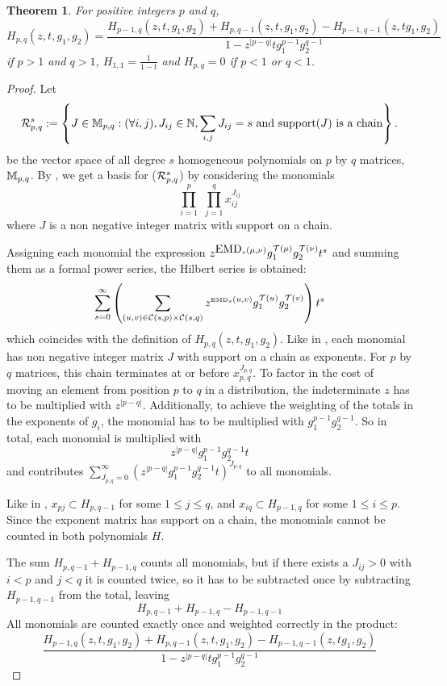 \documentclass[12pt,letterpaper,oneside,openany]{book}
\newtheorem{theorem}[equation]{Theorem}
\begin{document}
\setcounter{section}{3}
\begin{theorem}\label{thm:HSg}
 	For positive integers $p$ and $q$,
 	\[ H_{p,q}(z,t, g_1, g_2) = \frac{ H_{p-1,q}(z,t, g_1, g_2) + H_{p,q-1}(z,t, g_1, g_2) - H_{p-1,q-1}(z,tg_1, g_2) }{1- z^{|p-q|} tg_1^{p-1}g_2^{q-1}}  \]
 	if $p>1$ and $q>1$, $H_{1,1} = \frac{1}{1-t}$ and $H_{p,q}=0$ if $p<1$ or $q<1$.
\end{theorem}
\begin{proof}
	Let 
	\[
	{\mathcal{R}}_{p,q}^s :=  \left\{ J \in {\mathbb{M}}_{p,q} :(\forall i,j), J_{ij} \in {\mathbb{N}}, \sum_{i,j} J_{ij} = s \mbox{ and support$(J)$ is a chain}   \right\}.
	\]
	be the vector space of all degree $s$ homogeneous polynomials on $p$ by $q$ matrices, ${\mathbb{M}}_{p,q}$. 
 	By \cite{bourn2019expected}, we get a basis for  (${\mathcal{R}}_{p,q}^s$) by considering the monomials
 	\[
 	\prod_{i=1}^p \, \, \prod_{j=1}^q x_{ij}^{J_{ij}}
 	\]
 	where $J$ is a non negative integer matrix with support on a chain.
 	
 	Assigning each monomial the expression $z^{{\mbox{EMD}_s}(\mu,\nu)} g_1^{{\mathcal{T}}(\mu)}g_2^{{\mathcal{T}}(\nu)}t^s$ and summing them as a formal power series, the Hilbert series is obtained:
 	\[
 	\sum_{s=0}^\infty \left( \sum_{(u,v) \in {\mathcal{C}}(s,p) \times {\mathcal{C}}(s,q)}
 	z^{\tiny {\mbox{EMD}_s}(u,v)}g_1^{{\mathcal{T}}(u)}g_2^{{\mathcal{T}}(v)} \right) t^s
 	\]
 	which coincides with the definition of $H_{p,q}(z, t, g_1, g_2)$. 
 	Like in \cite{bourn2019expected}, each monomial has non negative integer matrix $J$ with support on a chain as exponents. For $p$ by $q$ matrices, this chain terminates at or before $x_{p,q}^{J_{p,q}}$.
 	To factor in the cost of moving an element from position $p$ to $q$ in a distribution, the indeterminate $z$ has to be multiplied with $z^{|p-q|}$. Additionally, to achieve the weighting of the totals in the exponents of $g_i$, the monomial has to be multiplied with $g_1^{p-1}g_2^{q-1}$. 
 	So in total, each monomial is multiplied with 
 	$$z^{|p-q|}g_1^{p-1}g_2^{q-1}t$$
 	and contributes $\sum_{J_{p,q}=0}^{\infty}(z^{|p-q|}g_1^{p-1}g_2^{q-1}t)^{J_{p,q}}$ to all monomials.
 	
 	Like in \cite{bourn2019expected}, $x_{pj} \subset H_{p,q-1}$ for some $1 \leq j \leq q$, and $x_{iq} \subset H_{p-1,q}$ for some $1 \leq i \leq p$. Since the exponent matrix has support on a chain, the monomials cannot be counted in both polynomials $H$.
 	
 	The sum $H_{p,q-1}+H_{p-1,q}$ counts all monomials, but if there exists a $J_{ij}>0$ with $i<p$ and $j<q$ it is counted twice, so it has to be subtracted once by subtracting $H_{p-1, q-1}$ from the total, leaving
 	$$H_{p,q-1}+H_{p-1,q}-H_{p-1, q-1}$$
 	All monomials are counted exactly once and weighted correctly in the product:
 	\[ 
 		\frac{ H_{p-1,q}(z,t, g_1, g_2) + H_{p,q-1}(z,t, g_1, g_2) - H_{p-1,q-1}(z,tg_1, g_2) }{1- z^{|p-q|} tg_1^{p-1}g_2^{q-1}}  
 	\]
 	
 	
\end{proof}
\setcounter{section}{0}
\end{document}
